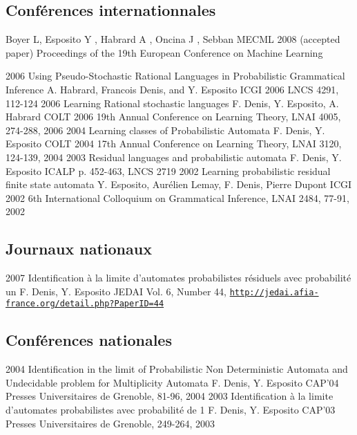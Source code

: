 \subsection*{Conférences internationnales}

{Boyer L, Esposito Y , Habrard A , Oncina J , Sebban M}{ECML 2008}
{(accepted paper) Proceedings of the 19th European Conference on Machine Learning}



\article
{2006} %
{Using Pseudo-Stochastic Rational Languages in Probabilistic Grammatical Inference} %
{A. Habrard, Francois Denis, and Y. Esposito} %
{ICGI 2006} %
{LNCS 4291, 112-124} %
\article
{2006}
{Learning Rational stochastic languages}
{F. Denis, Y. Esposito, A. Habrard}
{COLT 2006}
{19th Annual Conference on Learning Theory, LNAI 4005, 274-288, 2006}
\article
{2004}
{Learning classes of Probabilistic Automata}
{F. Denis, Y. Esposito}
{COLT 2004}
{17th Annual Conference on Learning Theory, LNAI 3120, 124-139, 2004}
\article
{2003}
{Residual languages and probabilistic automata}
{F. Denis, Y. Esposito}
{ICALP}
{p. 452-463, LNCS 2719}
\article
{2002}
{Learning probabilistic residual finite state automata}
{Y. Esposito, Aurélien Lemay, F. Denis, Pierre Dupont}
{ICGI 2002}
{6th International Colloquium on Grammatical Inference,  LNAI 2484, 77-91, 2002}

\subsection*{Journaux nationaux}

\article
{2007}
{Identification à la limite d'automates probabilistes résiduels avec probabilité un}
{F. Denis, Y. Esposito}
{JEDAI}
{Vol. 6, Number 44, \href{http://jedai.afia-france.org/detail.php?PaperID=44}{\texttt{http://jedai.afia-france.org/detail.php?PaperID=44}}}

\subsection*{Conférences nationales}

\article
{2004}
{Identification in the limit of Probabilistic Non Deterministic Automata and Undecidable problem for Multiplicity Automata}
{F. Denis, Y. Esposito}
{CAP'04}
{Presses Universitaires de Grenoble, 81-96, 2004}
\article
{2003}
{Identification à la limite d'automates probabilistes avec probabilité de 1}
{F. Denis, Y. Esposito}
{CAP'03}
{Presses Universitaires de Grenoble, 249-264, 2003}

